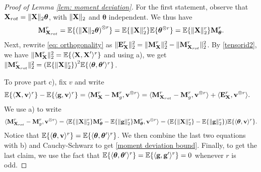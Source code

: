 \documentclass[final,12pt]{colt2018} %
\numberwithin{equation}{section}
\DeclarePairedDelimiter{\norm}{\lVert}{\rVert}
\DeclarePairedDelimiter{\paren}{(}{)}
\DeclarePairedDelimiter{\braces}{\lbrace}{\rbrace}
\DeclarePairedDelimiter{\inprod}{\langle}{\rangle}
\newcommand{\E}{\mathbb{E}}
\newcommand{\boldg}{\textbf{g}}
\newcommand{\boldv}{\textbf{v}}
\newcommand{\boldtheta}{\boldsymbol{\theta}}
\newcommand{\boldX}{\textbf{X}}
\newcommand{\boldM}{\textbf{M}}
\newcommand{\tensor}{\otimes}
\begin{document}
\begin{proof}[Proof of Lemma \ref{lem: moment deviation}]
	For the first statement, observe that $\boldX_{rot} = \norm{\boldX}_2\boldtheta$, with $\norm{\boldX}_2$ and $\boldtheta$ independent. We thus have
	\[
	\boldM^r_{\boldX_{rot}} = \E\braces{\paren*{\norm{\boldX}_2\boldtheta}^{\tensor r}} = \E\braces{\norm{\boldX}_2^r}\E\braces{\boldtheta^{\tensor r}} =  \E\braces{\norm{\boldX}_2^r}\boldM_{\boldtheta}^r.
	\]
	Next, rewrite \eqref{eq: orthogonality} as $\norm{\textbf{E}^r_\boldX}^2_2 = \norm{\boldM^r_\boldX}_2^2 - \norm{\boldM^r_{\boldX_{rot}}}_2^2$. By \eqref{tensorid2}, we have $\norm{\boldM^r_\boldX}_2^2 = \E\braces{\inprod{\boldX,\boldX'}^r}$ and using a), we get $\norm{\boldM^r_{\boldX_{rot}}}_2^2 = \paren*{\E\braces{\norm{\boldX}^r_2}}^2\E\braces{\inprod{\boldtheta,\boldtheta'}^r}$.
	
	To prove part c), fix $v$ and write
	\begin{align*}
	\E\braces{\inprod{\boldX,\boldv}^r} - \E\braces{\inprod{\boldg,\boldv}^r} & = \inprod{\boldM^r_\boldX-\boldM^r_g,\boldv^{\tensor r}} = \inprod{\boldM^r_{\boldX_{rot}}-\boldM^r_g,\boldv^{\tensor r}} + \inprod{\textbf{E}^r_\boldX,\boldv^{\tensor r}}.
	\end{align*}
	We use a) to write
	\[
	\inprod{\boldM^r_{\boldX_{rot}}-\boldM^r_g,\boldv^{\tensor r}} = \inprod{\E\braces{\norm{\boldX}_2^r}\boldM^r_{\boldtheta}-\E\braces{\norm{\boldg}_2^r}\boldM^r_{\boldtheta},\boldv^{\tensor r}} = \paren*{\E\braces{\norm{\boldX}_2^r}-\E\braces{\norm{\boldg}_2^r}}\E\braces{\inprod{\boldtheta,\boldv}^r}.
	\]
	Notice that $\E\braces{\inprod{\boldtheta,\boldv}^r} = \E\braces{\inprod{\boldtheta,\boldtheta'}^r}$. We then combine the last two equations with b) and Cauchy-Schwarz to get \eqref{moment deviation bound}. Finally, to get the last claim, we use the fact that $\E\braces{\inprod{\boldtheta,\boldtheta'}^r} = \E\braces{\inprod{\boldg,\boldg'}^r} = 0$ whenever $r$ is odd.
\end{proof}
\end{document}
